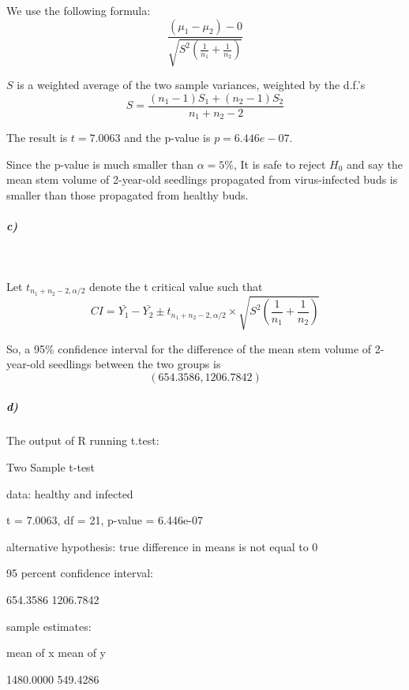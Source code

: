 \documentclass{article}
\begin{document}
We use the following formula:
\[\frac{(\mu_1-\mu_2)-0}{\sqrt{S^2(\frac{1}{n_1}+\frac{1}{n_2})}}\]

$S$ is a weighted average of the two sample variances, weighted by the d.f.’s
\[S=\frac{(n_1-1)S_1+(n_2-1)S_2}{n_1+n_2-2}\]

The result is $t=7.0063$ and the p-value is $p =6.446e-07$.

Since the p-value is much smaller than $\alpha=5\%$, It is safe to reject $H_0$ and say the mean stem volume of 2-year-old seedlings propagated from virus-infected buds is smaller than those propagated from healthy buds. 
\subparagraph{c)}~{}

Let $t_{n_1+n_2-2,\alpha/2}$ denote the t critical value such that 
\[CI=\bar{Y_1}-\bar{Y_2}\pm t_{n_1+n_2-2,\alpha/2}\times \sqrt{S^2(\frac{1}{n_1}+\frac{1}{n_2})}\]

So, a 95\% conﬁdence interval for the diﬀerence of the mean stem volume of 2-year-old seedlings between the two groups is\[(654.3586,1206.7842)\]
\subparagraph{d)}The output of R running t.test: 

Two Sample t-test

data:  healthy and infected

t = 7.0063, df = 21, p-value = 6.446e-07

alternative hypothesis: true difference in means is not equal to 0

95 percent confidence interval:

  654.3586 1206.7842

sample estimates:

mean of x mean of y 

1480.0000  549.4286 
\end{document}
